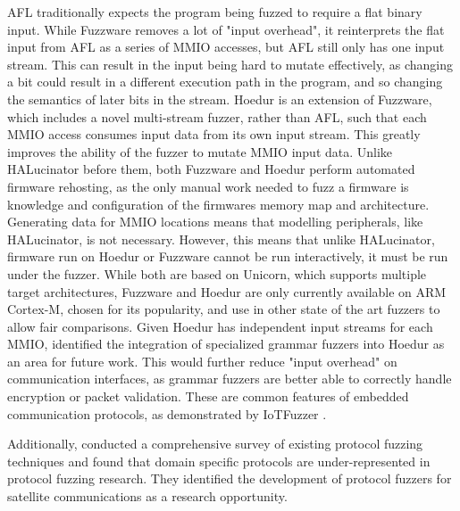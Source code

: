 \documentclass[../report.tex]{subfiles}
\begin{document}
AFL traditionally expects the program being fuzzed to require a flat binary input.
While Fuzzware removes a lot of "input overhead", it reinterprets the flat
input from AFL as a series of MMIO accesses, but AFL still only has one input
stream. This can result in the input being hard to mutate effectively, as
changing a bit could result in a different execution path in the program, and
so changing the semantics of later bits in the stream.
Hoedur \citep{Hoedur_2023} is an extension of Fuzzware, which includes a novel
multi-stream fuzzer, rather than AFL, such that each MMIO access consumes input
data from its own input stream. This greatly improves the ability of the fuzzer
to mutate MMIO input data. Unlike HALucinator before them, both Fuzzware and
Hoedur perform automated firmware rehosting, as the only manual work needed to
fuzz a firmware is knowledge and configuration of the firmwares memory map and
architecture. Generating data for MMIO locations means that modelling
peripherals, like HALucinator, is not necessary. However, this means that
unlike HALucinator, firmware run on Hoedur or Fuzzware cannot be run
interactively, it must be run under the fuzzer. While both are based on
Unicorn, which supports multiple target architectures, Fuzzware and Hoedur are
only currently available on ARM Cortex-M, chosen for its popularity, and use in
other state of the art fuzzers to allow fair comparisons. Given Hoedur has
independent input streams for each MMIO, \citet{Hoedur_2023} identified the
integration of specialized grammar fuzzers into Hoedur as an area for future
work. This would further reduce "input overhead" on communication interfaces,
as grammar fuzzers are better able to correctly handle encryption or packet
validation. These are common features of embedded communication protocols, as
demonstrated by IoTFuzzer \citep{IOTFuzzer_2018}.

Additionally, \citet{Zhang_2024} conducted a comprehensive survey of existing
protocol fuzzing techniques and found that domain specific protocols are
under-represented in protocol fuzzing research. They identified the development
of protocol fuzzers for satellite communications as a research opportunity.
\end{document}
